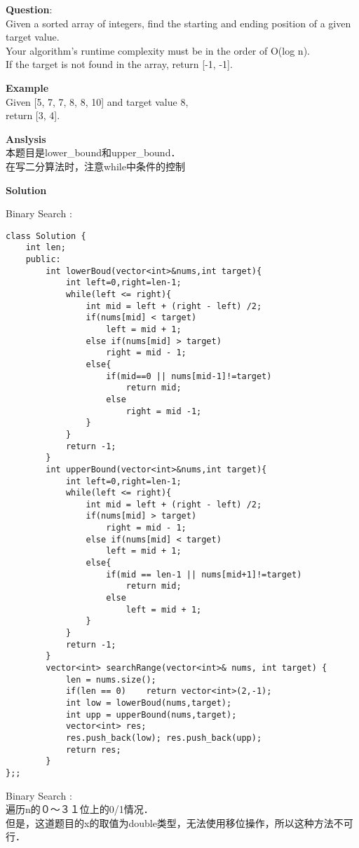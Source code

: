     
\begin{description}
    \item{\textbf{Question}}:\\%
		Given a sorted array of integers, find the starting and ending position of a given target value.\\
		Your algorithm's runtime complexity must be in the order of O(log n).\\
		If the target is not found in the array, return [-1, -1].\\

    \item{\textbf{Example}}\\
		Given [5, 7, 7, 8, 8, 10] and target value 8,\\
		return [3, 4].\\

    \item{\textbf{Anslysis}}\\
		本题目是lower\_bound和upper\_bound．\\
		在写二分算法时，注意while中条件的控制\\

    \item{\textbf{Solution}}\\
	\item{Binary Search} : \\
		\begin{lstlisting}
class Solution {
	int len;
	public:
		int lowerBoud(vector<int>&nums,int target){
			int left=0,right=len-1;
			while(left <= right){
				int mid = left + (right - left) /2;
				if(nums[mid] < target)
					left = mid + 1;
				else if(nums[mid] > target)
					right = mid - 1;
				else{
					if(mid==0 || nums[mid-1]!=target)
						return mid;
					else
						right = mid -1;
				}
			}
			return -1;
		}
		int upperBound(vector<int>&nums,int target){
			int left=0,right=len-1;
			while(left <= right){
				int mid = left + (right - left) /2;
				if(nums[mid] > target)
					right = mid - 1;
				else if(nums[mid] < target)
					left = mid + 1;
				else{
					if(mid == len-1 || nums[mid+1]!=target)
						return mid;
					else
						left = mid + 1;
				}
			}
			return -1;
		}
		vector<int> searchRange(vector<int>& nums, int target) {
			len = nums.size();
			if(len == 0)	return vector<int>(2,-1);
			int low = lowerBoud(nums,target);
			int upp = upperBound(nums,target);
			vector<int> res;
			res.push_back(low);	res.push_back(upp);
			return res;
		}
};;		\end{lstlisting}

	\item{Binary Search} : \\
		遍历n的０～３１位上的0/1情况．\\
		但是，这道题目的x的取值为double类型，无法使用移位操作，所以这种方法不可行．\\
\end{description}

